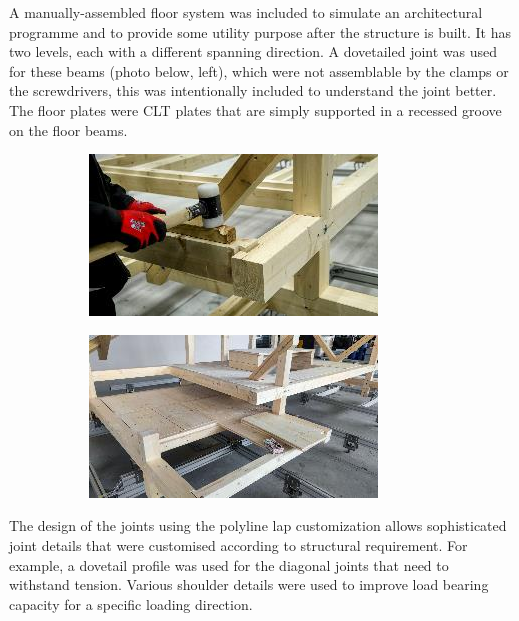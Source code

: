 \documentclass[11pt]{book}
\begin{document}
A manually-assembled floor system was included to simulate an architectural programme and to provide some utility purpose after the structure is built. It has two levels, each with a different spanning direction. A dovetailed joint was used for these beams (photo below, left), which were not assemblable by the clamps or the screwdrivers, this was intentionally included to understand the joint better. The floor plates were CLT plates that are simply supported in a recessed groove on the floor beams.

\begin{figure}[H]
\centering
\begin{subfigure}[b]{0.45\textwidth}
\centering
\includegraphics[width=\textwidth]{./images/image23.jpeg}
\end{subfigure}
\hfill
\begin{subfigure}[b]{0.45\textwidth}
\centering
\includegraphics[width=\textwidth]{./images/image24.jpeg}
\end{subfigure}
\end{figure}


The design of the joints using the polyline lap customization allows sophisticated joint details that were customised according to structural requirement. For example, a dovetail profile was used for the diagonal joints that need to withstand tension. Various shoulder details were used to improve load bearing capacity for a specific loading direction.
\end{document}
